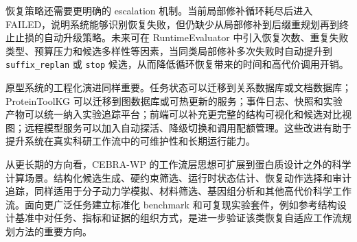 恢复策略还需要更明确的 escalation 机制。当前局部修补循环耗尽后进入
FAILED，说明系统能够识别恢复失败，但仍缺少从局部修补到后缀重规划再到终止止损的自动升级策略。未来可在
RuntimeEvaluator
中引入恢复次数、重复失败类型、预算压力和候选多样性等因素，当同类局部修补多次失败时自动提升到
\texttt{suffix\_replan} 或 \texttt{stop}
候选，从而降低循环恢复带来的时间和高代价调用开销。

原型系统的工程化演进同样重要。任务状态可以迁移到关系数据库或文档数据库；ProteinToolKG
可以迁移到图数据库或可热更新的服务；事件日志、快照和实验产物可以统一纳入实验追踪平台；前端可以补充更完整的结构可视化和候选对比视图；远程模型服务可以加入自动探活、降级切换和调用配额管理。这些改进有助于提升系统在真实科研工作流中的可维护性和长期运行能力。

从更长期的方向看，CEBRA-WP
的工作流层思想可扩展到蛋白质设计之外的科学计算场景。结构化候选生成、硬约束筛选、运行时状态估计、恢复动作选择和审计追踪，同样适用于分子动力学模拟、材料筛选、基因组分析和其他高代价科学工作流。面向更广泛任务建立标准化
benchmark
和可复现实验套件，例如参考结构设计基准中对任务、指标和证据的组织方式\citep{pdbstruct2023}，是进一步验证该类恢复自适应工作流规划方法的重要方向。
